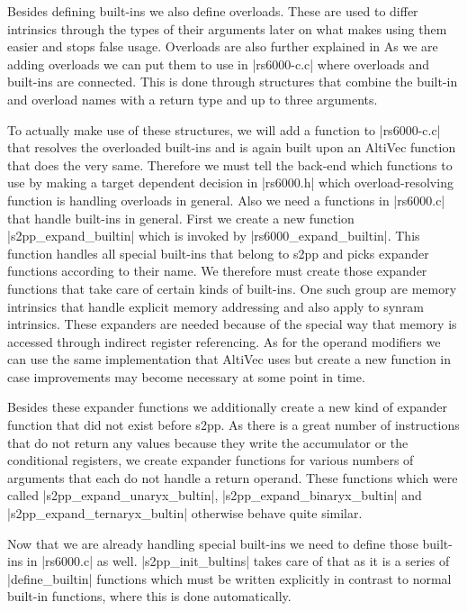 Besides defining built-ins we also define overloads.
These are used to differ intrinsics through the types of their arguments later on what makes using them easier and stops false usage.
Overloads are also further explained in \cite{heimbrecht_2017internship}
As we are adding overloads we can put them to use in |rs6000-c.c| where overloads and built-ins are connected.
This is done through structures that combine the built-in and overload names with a return type and up to three arguments.

To actually make use of these structures, we will add a function to |rs6000-c.c| that resolves the overloaded built-ins and is again built upon an AltiVec function that does the very same.
Therefore we must tell the back-end which functions to use by making a target dependent decision in |rs6000.h| which overload-resolving function is handling overloads in general.
Also we need a functions in |rs6000.c| that handle built-ins in general.
First we create a new function |s2pp_expand_builtin| which is invoked by |rs6000_expand_builtin|.
This function handles all special built-ins that belong to s2pp and picks expander functions according to their name.
We therefore must create those expander functions that take care of certain kinds of built-ins.
One such group are memory intrinsics that handle explicit memory addressing and also apply to synram intrinsics.
These expanders are needed because of the special way that memory is accessed through indirect register referencing.
As for the operand modifiers we can use the same implementation that AltiVec uses but create a new function in case improvements may become necessary at some point in time.

Besides these expander functions we additionally create a new kind of expander function that did not exist before s2pp.
As there is a great number of instructions that do not return any values because they write the accumulator or the conditional registers, we create expander functions for various numbers of arguments that each do not handle a return operand.
These functions which were called |s2pp_expand_unaryx_bultin|, |s2pp_expand_binaryx_bultin| and |s2pp_expand_ternaryx_bultin| otherwise behave quite similar.

Now that we are already handling special built-ins we need to define those built-ins in |rs6000.c| as well.
|s2pp_init_bultins| takes care of that as it is a series of |define_builtin| functions which must be written explicitly in contrast to normal built-in functions, where this is done automatically.

